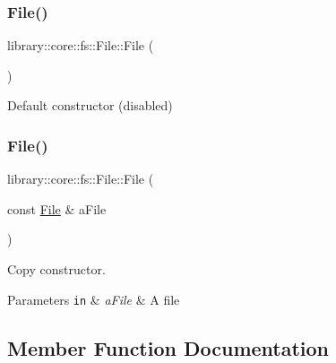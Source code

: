 \subsubsection{\texorpdfstring{File()}{File()}\hspace{0.1cm}{\footnotesize\ttfamily [1/2]}}
{\footnotesize\ttfamily library\+::core\+::fs\+::\+File\+::\+File (\begin{DoxyParamCaption}{ }\end{DoxyParamCaption})\hspace{0.3cm}{\ttfamily [delete]}}



Default constructor (disabled) 

\mbox{\label{classlibrary_1_1core_1_1fs_1_1File_a6f3f0d79545ac9984c6f49432f0c6c39}} 
\subsubsection{\texorpdfstring{File()}{File()}\hspace{0.1cm}{\footnotesize\ttfamily [2/2]}}
{\footnotesize\ttfamily library\+::core\+::fs\+::\+File\+::\+File (\begin{DoxyParamCaption}\item[{const \hyperlink{classlibrary_1_1core_1_1fs_1_1File}{File} \&}]{a\+File }\end{DoxyParamCaption})}



Copy constructor. 


\begin{DoxyParams}[1]{Parameters}
\mbox{\tt in}  & {\em a\+File} & A file \\
\hline
\end{DoxyParams}


\subsection{Member Function Documentation}
\mbox{\label{classlibrary_1_1core_1_1fs_1_1File_a0b95ab08dd8df2cc28b2e42a72ae0b9a}} 
